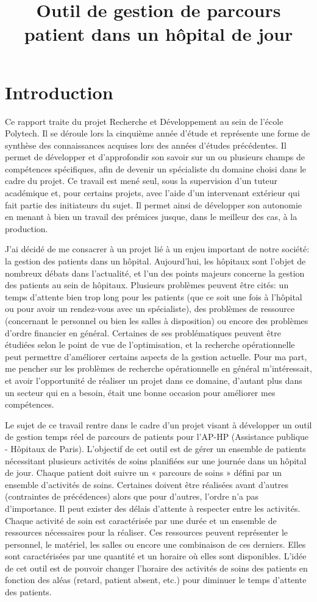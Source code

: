 \documentclass{polytech/polytech}
\title{Outil de gestion de parcours patient dans un hôpital de jour}
\begin{document}
\chapter*{Introduction}

Ce rapport traite du projet Recherche et Développement au sein de l'école Polytech. Il se déroule lors la cinquième année d'étude et représente une forme de synthèse des connaissances acquises lors des années d’études précédentes. Il permet de développer et d’approfondir son savoir sur un ou plusieurs champs de compétences spécifiques, afin de devenir un spécialiste du domaine choisi dans le cadre du projet. Ce travail est mené seul, sous la supervision d'un tuteur académique et, pour certains projets, avec l’aide d’un intervenant extérieur qui fait partie des initiateurs du sujet. Il permet ainsi de développer son autonomie en menant à bien un travail des prémices jusque, dans le meilleur des cas, à la production.

J'ai décidé de me consacrer à un projet lié à un enjeu important de notre société: la gestion des patients dans un hôpital. Aujourd'hui, les hôpitaux sont l'objet de nombreux débats dans l'actualité, et l'un des points majeurs concerne la gestion des patients au sein de hôpitaux. Plusieurs problèmes peuvent être cités: un temps d'attente bien trop long pour les patients (que ce soit une fois à l'hôpital ou pour avoir un rendez-vous avec un spécialiste), des problèmes de ressource (concernant le personnel ou bien les salles à disposition) ou encore des problèmes d'ordre financier en général. Certaines de ses problématiques peuvent être étudiées selon le point de vue de l'optimisation, et la recherche opérationnelle peut permettre d'améliorer certains aspects de la gestion actuelle. Pour ma part, me pencher sur les problèmes de recherche opérationnelle en général m'intéressait, et avoir l'opportunité de réaliser un projet dans ce domaine, d'autant plus dans un secteur qui en a besoin, était une bonne occasion pour améliorer mes compétences.

Le sujet de ce travail rentre dans le cadre d’un projet visant à développer un outil de gestion temps réel de parcours de patients pour l’AP-HP (Assistance publique - Hôpitaux de Paris). L'objectif de cet outil est de gérer un ensemble de patients nécessitant plusieurs activités de soins planifiées sur une journée dans un hôpital de jour. Chaque patient doit suivre un « parcours de soins » défini par un ensemble d’activités de soins. Certaines doivent être réalisées avant d’autres (contraintes de précédences) alors que pour d'autres, l’ordre n’a pas d’importance. Il peut exister des délais d'attente à respecter entre les activités. Chaque activité de soin est caractérisée par une durée et un ensemble de ressources nécessaires pour la réaliser. Ces ressources peuvent représenter le personnel, le matériel, les salles ou encore une combinaison de ces derniers. Elles sont caractérisées par une quantité et un horaire où elles sont disponibles. L’idée de cet outil est de pouvoir changer l’horaire des activités de soins des patients en fonction des aléas (retard, patient absent, etc.) pour diminuer le temps d’attente des patients.
\end{document}
